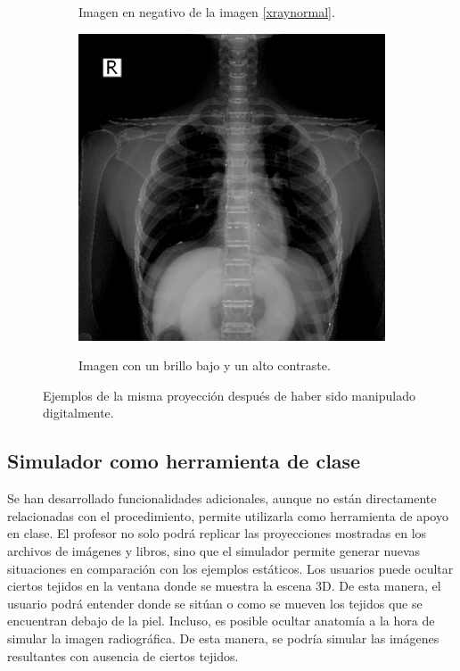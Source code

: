 \begin{figure}[h]
\begin{subfigure}[b]{0.3\linewidth}
        \caption{Imagen en negativo de la imagen \ref{xraynormal}.}
    \end{subfigure}
    \null\hfill
     \begin{subfigure}[b]{0.3\linewidth}
        \centering
        {\includegraphics[width=\linewidth]{IMG/XRayMaleFilter2.png}}
        \caption{Imagen con un brillo bajo y un alto contraste.}
    \end{subfigure}
    \caption{\label{fig:imgmani}  Ejemplos de la misma proyección después de haber sido manipulado digitalmente.}
   \end{figure}



\subsection{Simulador como herramienta de clase}
\label{xray:sim}

Se han desarrollado funcionalidades adicionales, aunque no están directamente relacionadas con el procedimiento,  permite utilizarla como herramienta de apoyo en clase. El profesor no solo podrá replicar las proyecciones mostradas en los archivos de imágenes y libros, sino que el simulador permite generar nuevas situaciones en comparación con los ejemplos estáticos.  %
Los usuarios puede ocultar ciertos tejidos en la ventana donde se muestra la escena 3D. De esta manera, el usuario podrá entender donde se sitúan o como se mueven los tejidos que se encuentran debajo de la piel. Incluso, es posible ocultar anatomía a la hora de simular la imagen radiográfica. De esta manera, se podría simular las imágenes resultantes con ausencia de ciertos tejidos. 

